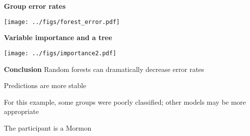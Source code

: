 \documentclass[mathserif, 11pt, t]{beamer}
\renewcommand{\subtitle}[1]{\vspace{0.45cm}\textcolor{bluegreen}{
    {\textbf{#1}}}\vspace{0.15cm}\newline}
\begin{document}
\begin{frame}
\subtitle{Group error rates}
\begin{center}
\texttt{[image: ../figs/forest\_error.pdf]}
\end{center}
\end{frame}

\begin{frame}
\subtitle{Variable importance and a tree}
\begin{center}
\texttt{[image: ../figs/importance2.pdf]}
\end{center}
\end{frame}

\begin{frame}
\subtitle{Conclusion}
Random forests can dramatically decrease error rates
\bigskip

Predictions are more stable
\bigskip

For this example, some groups were poorly classified; other models may be more appropriate
\bigskip

The participant is a Mormon
\bigskip

\end{frame}
\end{document}
